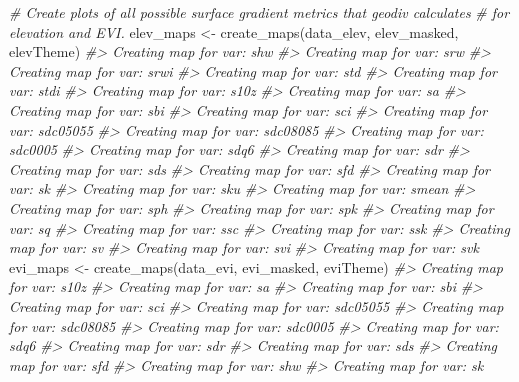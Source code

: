 \documentclass[
]{article}
\newenvironment{Shaded}{\begin{snugshade}}{\end{snugshade}}
\newcommand{\CommentTok}[1]{\textcolor[rgb]{0.56,0.35,0.01}{\textit{#1}}}
\newcommand{\FunctionTok}[1]{\textcolor[rgb]{0.00,0.00,0.00}{#1}}
\newcommand{\NormalTok}[1]{#1}
\newcommand{\OtherTok}[1]{\textcolor[rgb]{0.56,0.35,0.01}{#1}}
\begin{document}
\begin{Shaded}
\begin{Highlighting}[]
\CommentTok{\# Create plots of all possible surface gradient metrics that geodiv calculates }
\CommentTok{\# for elevation and EVI.}
\NormalTok{elev\_maps }\OtherTok{\textless{}{-}} \FunctionTok{create\_maps}\NormalTok{(data\_elev, elev\_masked, elevTheme)}
\CommentTok{\#\textgreater{} Creating map for var: shw}
\CommentTok{\#\textgreater{} Creating map for var: srw}
\CommentTok{\#\textgreater{} Creating map for var: srwi}
\CommentTok{\#\textgreater{} Creating map for var: std}
\CommentTok{\#\textgreater{} Creating map for var: stdi}
\CommentTok{\#\textgreater{} Creating map for var: s10z}
\CommentTok{\#\textgreater{} Creating map for var: sa}
\CommentTok{\#\textgreater{} Creating map for var: sbi}
\CommentTok{\#\textgreater{} Creating map for var: sci}
\CommentTok{\#\textgreater{} Creating map for var: sdc05055}
\CommentTok{\#\textgreater{} Creating map for var: sdc08085}
\CommentTok{\#\textgreater{} Creating map for var: sdc0005}
\CommentTok{\#\textgreater{} Creating map for var: sdq6}
\CommentTok{\#\textgreater{} Creating map for var: sdr}
\CommentTok{\#\textgreater{} Creating map for var: sds}
\CommentTok{\#\textgreater{} Creating map for var: sfd}
\CommentTok{\#\textgreater{} Creating map for var: sk}
\CommentTok{\#\textgreater{} Creating map for var: sku}
\CommentTok{\#\textgreater{} Creating map for var: smean}
\CommentTok{\#\textgreater{} Creating map for var: sph}
\CommentTok{\#\textgreater{} Creating map for var: spk}
\CommentTok{\#\textgreater{} Creating map for var: sq}
\CommentTok{\#\textgreater{} Creating map for var: ssc}
\CommentTok{\#\textgreater{} Creating map for var: ssk}
\CommentTok{\#\textgreater{} Creating map for var: sv}
\CommentTok{\#\textgreater{} Creating map for var: svi}
\CommentTok{\#\textgreater{} Creating map for var: svk}
\NormalTok{evi\_maps }\OtherTok{\textless{}{-}} \FunctionTok{create\_maps}\NormalTok{(data\_evi, evi\_masked, eviTheme)}
\CommentTok{\#\textgreater{} Creating map for var: s10z}
\CommentTok{\#\textgreater{} Creating map for var: sa}
\CommentTok{\#\textgreater{} Creating map for var: sbi}
\CommentTok{\#\textgreater{} Creating map for var: sci}
\CommentTok{\#\textgreater{} Creating map for var: sdc05055}
\CommentTok{\#\textgreater{} Creating map for var: sdc08085}
\CommentTok{\#\textgreater{} Creating map for var: sdc0005}
\CommentTok{\#\textgreater{} Creating map for var: sdq6}
\CommentTok{\#\textgreater{} Creating map for var: sdr}
\CommentTok{\#\textgreater{} Creating map for var: sds}
\CommentTok{\#\textgreater{} Creating map for var: sfd}
\CommentTok{\#\textgreater{} Creating map for var: shw}
\CommentTok{\#\textgreater{} Creating map for var: sk}

\end{Highlighting}
\end{Shaded}
\end{document}

